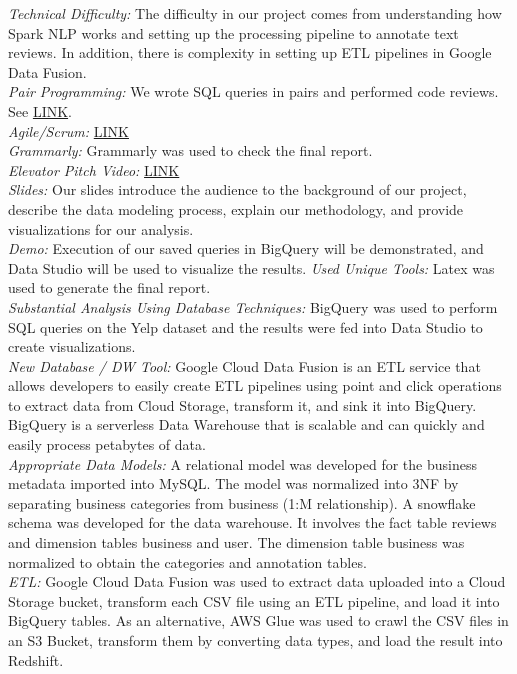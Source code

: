 \documentclass[11pt,journal,compsoc]{IEEEtran}
\begin{document}
\textit{Technical Difficulty:} The difficulty in our project comes from understanding how Spark NLP works and setting up the processing pipeline to annotate text reviews. In addition, there is complexity in setting up ETL pipelines in Google Data Fusion.   \\
\textit{Pair Programming:} We wrote SQL queries in pairs and performed code reviews. See \href{https://docs.google.com/document/u/1/d/1hZlhFjr7_z8AbwafHHmYNUxNNnhF1n_-k4luKLoJTvQ/}{LINK}. \\
\textit{Agile/Scrum:} \href{https://docs.google.com/document/u/1/d/1hZlhFjr7_z8AbwafHHmYNUxNNnhF1n_-k4luKLoJTvQ/}{LINK} \\
\textit{Grammarly:} Grammarly was used to check the final report. \\
\textit{Elevator Pitch Video:} \href{https://www.youtube.com/watch?v=sPYgaDde_nw}{LINK} \\
\textit{Slides:} Our slides introduce the audience to the background of our project, describe the data modeling process, explain our methodology, and provide visualizations for our analysis.  \\
\textit{Demo:} Execution of our saved queries in BigQuery will be demonstrated, and Data Studio will be used to visualize the results.
\textit{Used Unique Tools:} Latex was used to generate the final report.  \\
\textit{Substantial Analysis Using Database Techniques:} BigQuery was used to perform SQL queries on the Yelp dataset and the results were fed into Data Studio to create visualizations.  \\
\textit{New Database / DW Tool:} Google Cloud Data Fusion is an ETL service that allows developers to easily create ETL pipelines using point and click operations to extract data from Cloud Storage, transform it, and sink it into BigQuery. BigQuery is a serverless Data Warehouse that is scalable and can quickly and easily process petabytes of data. \\
\textit{Appropriate Data Models:} A relational model was developed for the business metadata imported into MySQL. The model was normalized into 3NF by separating business categories from business (1:M relationship). A snowflake schema was developed for the data warehouse. It involves the fact table reviews and dimension tables business and user. The dimension table business was normalized to obtain the categories and annotation tables. \\
\textit{ETL:} Google Cloud Data Fusion was used to extract data uploaded into a Cloud Storage bucket, transform each CSV file using an ETL pipeline, and load it into BigQuery tables. As an alternative, AWS Glue was used to crawl the CSV files in an S3 Bucket, transform them by converting data types, and load the result into Redshift.  \\
\end{document}
